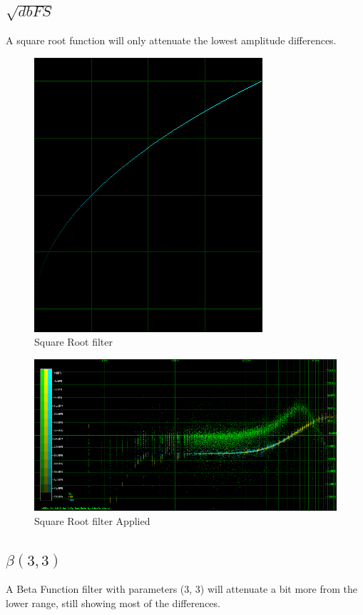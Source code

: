 \documentclass[10pt,a4paper]{report}
\begin{document}
\newpage
\subsection{$\sqrt{dbFS}$} 

A square root function will only attenuate the lowest amplitude differences.

\begin{figure}[H]
	\centering
	\includegraphics[width=0.4\linewidth]{plots/BetaFunctionPlot_1}
	\caption[Square Root filter]{Square Root filter}
	\label{fig:betafunctionplot1}
\end{figure}

\begin{figure}[H]
	\centering
	\includegraphics[width=1\linewidth]{plots/BetaFunctionPlot_1_Data}
	\caption[Square Root filter]{Square Root filter Applied}
	\label{fig:betafunctionplot1data}
\end{figure}

\newpage
\subsection{$\beta(3,3)$}

A Beta Function filter with parameters (3, 3) will attenuate a bit more from the lower range, still showing most of the differences.
\end{document}
